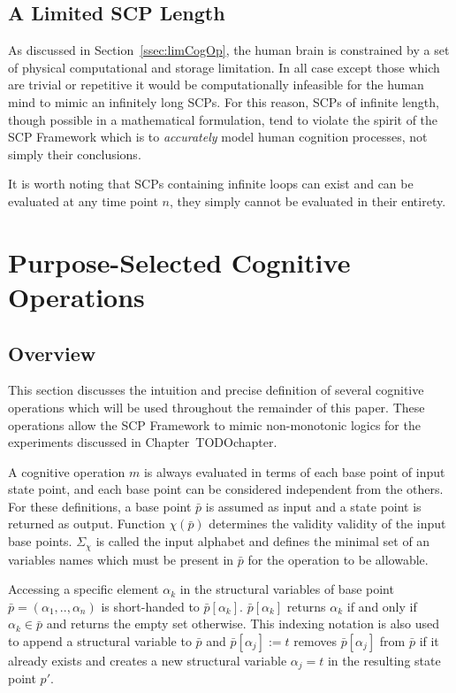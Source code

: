\subsection{A Limited SCP Length}
As discussed in Section~\ref{ssec:limCogOp}, the human brain is constrained by a set of physical computational and storage limitation. In all case except those which are trivial or repetitive it would be computationally infeasible for the human mind to mimic an infinitely long SCPs. For this reason, SCPs of infinite length, though possible in a mathematical formulation, tend to violate the spirit of the SCP Framework which is to \textit{accurately} model human cognition processes, not simply their conclusions.

It is worth noting that SCPs containing infinite loops can exist and can be evaluated at any time point $n$, they simply cannot be evaluated in their entirety.

\section{Purpose-Selected Cognitive Operations} \label{sec:pso}
\subsection{Overview}

This section discusses the intuition and precise definition of several cognitive operations which will be used throughout the remainder of this paper. These operations allow the SCP Framework to mimic non-monotonic logics for the experiments discussed in Chapter~TODOchapter.

A cognitive operation $m$ is always evaluated in terms of each base point of input state point, and each base point can be considered independent from the others. For these definitions, a base point $\bar{p}$ is assumed as input and a state point is returned as output. Function $\chi(\bar{p})$ determines the validity validity of the input base points. $\Sigma_\chi$ is called the input alphabet and defines the minimal set of an variables names which must be present in $\bar{p}$ for the operation to be allowable.

Accessing a specific element $\alpha_k$ in the structural variables of base point $\bar{p}=(\alpha_1,..,\alpha_n)$ is short-handed to $\bar{p}[\alpha_k]$. $\bar{p}[\alpha_k]$ returns $\alpha_k$ if and only if $\alpha_k \in \bar{p}$ and returns the empty set otherwise. This indexing notation is also used to append a structural variable to $\bar{p}$ and $\bar{p}[\alpha_j]:=t$ removes $\bar{p}[\alpha_j]$ from $\bar{p}$ if it already exists and creates a new structural variable $\alpha_j=t$ in the resulting state point $p'$.

